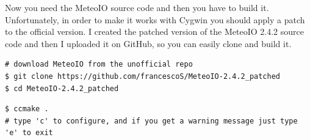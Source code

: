 

Now you need the MeteoIO source code and then you have to build it. Unfortunately, in order to make it works with Cygwin you should apply a patch to the official version. I created the patched version of the MeteoIO 2.4.2 source code and then I uploaded it on GitHub, so you can easily clone and build it.

\begin{lstlisting}[style=bashStyle]
# download MeteoIO from the unofficial repo
$ git clone https://github.com/francescoS/MeteoIO-2.4.2_patched
$ cd MeteoIO-2.4.2_patched
\end{lstlisting}

\begin{lstlisting}[style=bashStyle]
$ ccmake .
# type 'c' to configure, and if you get a warning message just type 'e' to exit
\end{lstlisting} %

